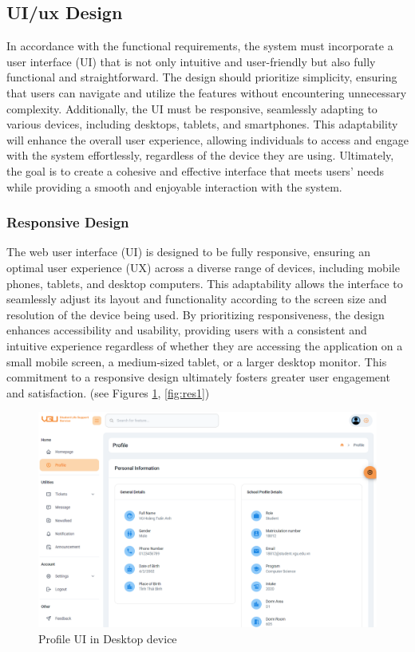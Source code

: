 \subsection{UI/\acs{ux} Design}
In accordance with the functional requirements, the system must incorporate a user interface (UI) that is not only intuitive and user-friendly but also fully functional and straightforward. The design should prioritize simplicity, ensuring that users can navigate and utilize the features without encountering unnecessary complexity. Additionally, the UI must be responsive, seamlessly adapting to various devices, including desktops, tablets, and smartphones. This adaptability will enhance the overall user experience, allowing individuals to access and engage with the system effortlessly, regardless of the device they are using. Ultimately, the goal is to create a cohesive and effective interface that meets users' needs while providing a smooth and enjoyable interaction with the system.

	
	\subsubsection{Responsive Design}
	The web user interface (UI) is designed to be fully responsive, ensuring an optimal user experience (UX) across a diverse range of devices, including mobile phones, tablets, and desktop computers. This adaptability allows the interface to seamlessly adjust its layout and functionality according to the screen size and resolution of the device being used. By prioritizing responsiveness, the design enhances accessibility and usability, providing users with a consistent and intuitive experience regardless of whether they are accessing the application on a small mobile screen, a medium-sized tablet, or a larger desktop monitor. This commitment to a responsive design ultimately fosters greater user engagement and satisfaction. (see Figures \ref{fig:res2}, \ref{fig:res1})
		
	\begin{figure}[H]
		\centering
		\includegraphics[width=1\linewidth]{graphics/responsive/res2}
		\caption{Profile UI in Desktop device}
		\label{fig:res2}
	\end{figure}
	
